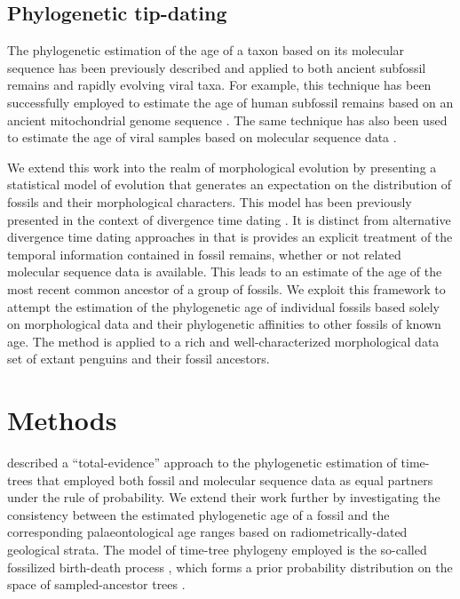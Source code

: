 \documentclass[11pt]{article}
\begin{document}
\subsection*{Phylogenetic tip-dating}

The phylogenetic estimation of the age of a taxon based on its molecular sequence has been previously described \autocite{drummond2002computational,shapiro2011bayesian} and applied to both ancient subfossil remains and rapidly evolving viral taxa. For example, this technique has been successfully employed to estimate the age of human subfossil remains based on an ancient mitochondrial genome sequence \autocite{meyer2014mitochondrial}. The same technique has also been used to estimate the age of viral samples based on molecular sequence data \autocite{gray2013evolutionary}.


We extend this work into the realm of morphological evolution by presenting a statistical model of evolution that generates an expectation on the distribution of fossils and their morphological characters. This model has been previously presented in the context of divergence time dating \autocite{gavr2014,gavryushkina2015bayesian}. It is distinct from alternative divergence time dating approaches in that is provides an explicit treatment of the temporal information contained in fossil remains, whether or not related molecular sequence data is available. This leads to an estimate of the age of the most recent common ancestor of a group of fossils. We exploit this framework to attempt the estimation of the phylogenetic age of individual fossils based solely on morphological data and their phylogenetic affinities to other fossils of known age. The method is applied to a rich and well-characterized morphological data set of extant penguins and their fossil ancestors.

\section*{Methods}

\textcite{gavryushkina2015bayesian} described a ``total-evidence'' approach to the phylogenetic estimation of time-trees that employed both fossil and molecular sequence data as equal partners under the rule of probability. We extend their work further by investigating the consistency between the estimated phylogenetic age of a fossil and the corresponding palaeontological age ranges based on radiometrically-dated geological strata. The model of time-tree phylogeny employed is the so-called fossilized birth-death process \autocite{Heath2014}, which forms a prior probability distribution on the space of sampled-ancestor trees \autocite{Gavr2013}.
\end{document}
